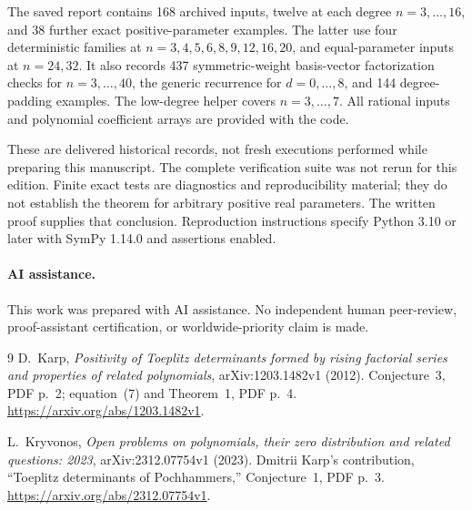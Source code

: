 \documentclass[11pt,a4paper]{article}
\begin{document}
The saved report contains 168 archived inputs, twelve at each degree \(n=3,\ldots,16\), and 38 further exact positive-parameter examples. The latter use four deterministic families at \(n=3,4,5,6,8,9,12,16,20\), and equal-parameter inputs at \(n=24,32\). It also records 437 symmetric-weight basis-vector factorization checks for \(n=3,\ldots,40\), the generic recurrence for \(d=0,\ldots,8\), and 144 degree-padding examples. The low-degree helper covers \(n=3,\ldots,7\). All rational inputs and polynomial coefficient arrays are provided with the code.

These are delivered historical records, not fresh executions performed while preparing this manuscript. The complete verification suite was not rerun for this edition. Finite exact tests are diagnostics and reproducibility material; they do not establish the theorem for arbitrary positive real parameters. The written proof supplies that conclusion. Reproduction instructions specify Python 3.10 or later with SymPy 1.14.0 and assertions enabled.

\paragraph{AI assistance.}

This work was prepared with AI assistance. No independent human peer-review, proof-assistant certification, or worldwide-priority claim is made.

\begin{thebibliography}{9}
D.~Karp, \emph{Positivity of Toeplitz determinants formed by rising factorial
series and properties of related polynomials}, arXiv:1203.1482v1 (2012).
Conjecture~3, PDF p.~2; equation~(7) and Theorem~1, PDF p.~4.
\url{https://arxiv.org/abs/1203.1482v1}.

L.~Kryvonos, \emph{Open problems on polynomials, their zero distribution and
related questions: 2023}, arXiv:2312.07754v1 (2023).
Dmitrii Karp's contribution, ``Toeplitz determinants of Pochhammers,''
Conjecture~1, PDF p.~3.
\url{https://arxiv.org/abs/2312.07754v1}.
\end{thebibliography}
\end{document}
